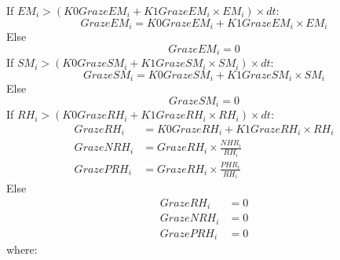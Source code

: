 If $EM_i > (K0GrazeEM_i + K1GrazeEM_i \times EM_i) \times dt$:
\begin{equation}
              GrazeEM_i = K0GrazeEM_i + K1GrazeEM_i \times EM_i
\end{equation}
Else
\begin{equation}
\nonumber     GrazeEM_i = 0
\end{equation}
If $SM_i > (K0GrazeSM_i + K1GrazeSM_i \times SM_i) \times dt$:
\begin{equation}
              GrazeSM_i = K0GrazeSM_i + K1GrazeSM_i \times SM_i
\end{equation}
Else
\begin{equation}
\nonumber     GrazeSM_i = 0
\end{equation}
If $RH_i > (K0GrazeRH_i + K1GrazeRH_i \times RH_i) \times dt$:
\begin{align}
              GrazeRH_i &= K0GrazeRH_i + K1GrazeRH_i \times RH_i            \\
\nonumber     GrazeNRH_i &= GrazeRH_i \times \frac{NHR_i}{RH_i}             \\
\nonumber     GrazePRH_i &= GrazeRH_i \times \frac{PHR_i}{RH_i}
\end{align}
Else
\begin{align}
\nonumber     GrazeRH_i &= 0   \\
\nonumber     GrazeNRH_i &= 0  \\
\nonumber     GrazePRH_i &= 0
\end{align}
%
where:

